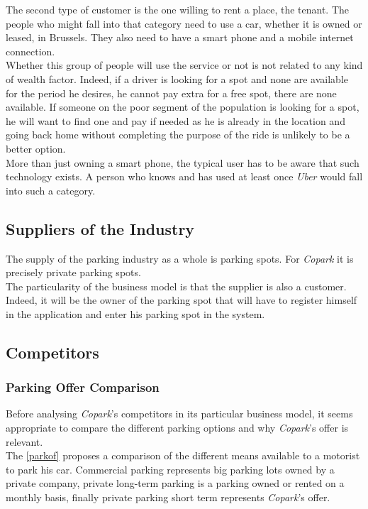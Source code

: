 \documentclass[12pt,a4paper,oneside]{book}
\newcommand{\bp}{\textit{Copark}}
\begin{document}
The second type of customer is the one willing to rent a place, the tenant. The people who might fall into that category need to use a car, whether it is owned or leased, in Brussels. They also need to have a smart phone and a mobile internet connection.\\

Whether this group of people will use the service or not is not related to any kind of wealth factor. Indeed, if a driver is looking for a spot and none are available for the period he desires, he cannot pay extra for a free spot, there are none available. If someone on the poor segment of the population is looking for a spot, he will want to find one and pay if needed as he is already in the location and going back home without completing the purpose of the ride is unlikely to be a better option.\\

More than just owning a smart phone, the typical user has to be aware that such technology exists. A person who knows and has used at least once \textit{Uber} would fall into such a category.

\subsection{Suppliers of the Industry}
The supply of the parking industry as a whole is parking spots. For \bp{} it is precisely private parking spots.\\

The particularity of the business model is that the supplier is also a customer. Indeed, it will be the owner of the parking spot that will have to register himself in the application and enter his parking spot in the system.

\subsection{Competitors}
\subsubsection{Parking Offer Comparison}
\label{poc}
Before analysing \bp{}'s competitors in its particular business model, it seems appropriate to compare the different parking options and why \bp{}'s offer is relevant.\\

The \autoref{parkof} proposes a comparison of the different means available to a motorist to park his car. Commercial parking represents big parking lots owned by a private company, private long-term parking is a parking owned or rented on a monthly basis, finally private parking short term represents \bp{}'s offer.\\
\end{document}
